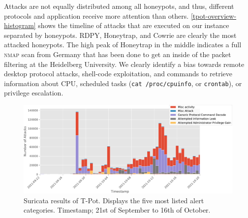 Attacks are not equally distributed among all honeypots, and thus, different protocols and application receive more attention than others.
\autoref{tpot-overview-histogram} shows the timeline of attacks that are executed on our instance separated by honeypots.
RDPY, Honeytrap, and Cowrie are clearly the most attacked honeypots.
The high peak of Honeytrap in the middle indicates a full \textsc{nmap} scan from Germany that has been done to get an inside of the packet filtering at the Heidelberg University.
We clearly identify a bias towards remote desktop protocol attacks, shell-code exploitation, and commands to retrieve information about CPU, scheduled tasks (\verb|cat /proc/cpuinfo|, or \verb|crontab|), or privilege escalation.

\begin{figure}[ht]
    \centering
    \includegraphics[width=\textwidth]{figures/tpot-suricata-alerts.pdf}
    \caption[Suricata results of T-Pot]{Suricata results of T-Pot. Displays the five most listed alert categories. Timestamp; 21st of September to 16th of October.}
    \label{fig:suricata-results}
\end{figure}

